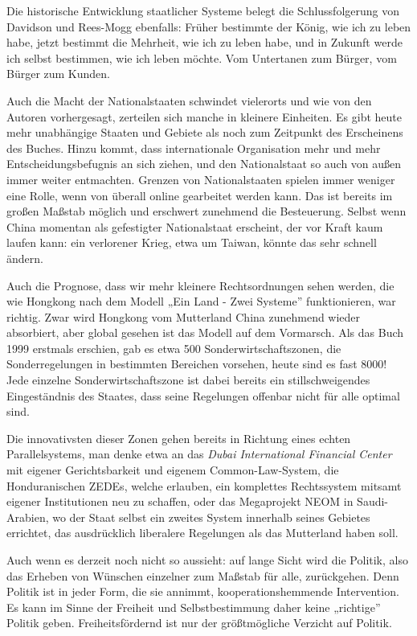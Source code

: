 \documentclass[
  a5paper,
  smalldemyvopaper,10pt,twoside,onecolumn,openright,extrafontsizes,hidelinks]{memoir}
\begin{document}
Die historische Entwicklung staatlicher Systeme belegt die
Schlussfolgerung von Davidson und Rees-Mogg ebenfalls: Früher bestimmte
der König, wie ich zu leben habe, jetzt bestimmt die Mehrheit, wie ich
zu leben habe, und in Zukunft werde ich selbst bestimmen, wie ich leben
möchte. Vom Untertanen zum Bürger, vom Bürger zum Kunden.

Auch die Macht der Nationalstaaten schwindet vielerorts und wie von den
Autoren vorhergesagt, zerteilen sich manche in kleinere Einheiten. Es
gibt heute mehr unabhängige Staaten und Gebiete als noch zum Zeitpunkt
des Erscheinens des Buches. Hinzu kommt, dass internationale
Organisation mehr und mehr Entscheidungsbefugnis an sich ziehen, und den
Nationalstaat so auch von außen immer weiter entmachten. Grenzen von
Nationalstaaten spielen immer weniger eine Rolle, wenn von überall
online gearbeitet werden kann. Das ist bereits im großen Maßstab möglich
und erschwert zunehmend die Besteuerung. Selbst wenn China momentan als
gefestigter Nationalstaat erscheint, der vor Kraft kaum laufen kann: ein
verlorener Krieg, etwa um Taiwan, könnte das sehr schnell ändern.

Auch die Prognose, dass wir mehr kleinere Rechtsordnungen sehen werden,
die wie Hongkong nach dem Modell „Ein Land - Zwei Systeme''
funktionieren, war richtig. Zwar wird Hongkong vom Mutterland China
zunehmend wieder absorbiert, aber global gesehen ist das Modell auf dem
Vormarsch. Als das Buch 1999 erstmals erschien, gab es etwa 500
Sonderwirtschaftszonen, die Sonderregelungen in bestimmten Bereichen
vorsehen, heute sind es fast 8000! Jede einzelne Sonderwirtschaftszone
ist dabei bereits ein stillschweigendes Eingeständnis des Staates, dass
seine Regelungen offenbar nicht für alle optimal sind.

Die innovativsten dieser Zonen gehen bereits in Richtung eines echten
Parallelsystems, man denke etwa an das \emph{Dubai International
Financial Center} mit eigener Gerichtsbarkeit und eigenem
Common-Law-System, die Honduranischen ZEDEs, welche erlauben, ein
komplettes Rechtssystem mitsamt eigener Institutionen neu zu schaffen,
oder das Megaprojekt NEOM in Saudi-Arabien, wo der Staat selbst ein
zweites System innerhalb seines Gebietes errichtet, das ausdrücklich
liberalere Regelungen als das Mutterland haben soll.

Auch wenn es derzeit noch nicht so aussieht: auf lange Sicht wird die
Politik, also das Erheben von Wünschen einzelner zum Maßstab für alle,
zurückgehen. Denn Politik ist in jeder Form, die sie annimmt,
kooperationshemmende Intervention. Es kann im Sinne der Freiheit und
Selbstbestimmung daher keine „richtige'' Politik geben.
Freiheitsfördernd ist nur der größtmögliche Verzicht auf Politik.
\end{document}
